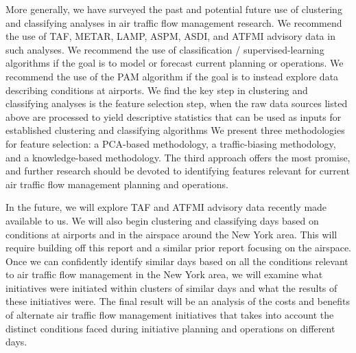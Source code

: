\documentclass[11pt]{scrartcl}
\begin{document}
More generally, we have surveyed the past and potential future use of clustering and classifying analyses in air traffic flow management research.  We recommend the use of TAF, METAR, LAMP, ASPM, ASDI, and ATFMI advisory data in such analyses.  We recommend the use of classification / supervised-learning algorithms if the goal is to model or forecast current planning or operations.  We recommend the use of the PAM algorithm if the goal is to instead explore data describing conditions at airports.  We find the key step in clustering and classifying analyses is the feature selection step, when the raw data sources listed above are processed to yield descriptive statistics that can be used as inputs for established clustering and classifying algorithms  We present three methodologies for feature selection: a PCA-based methodology, a traffic-biasing methodology, and a knowledge-based methodology.  The third approach offers the most promise, and further research should be devoted to identifying features relevant for current air traffic flow management planning and operations.

In the future, we will explore TAF and ATFMI advisory data recently made available to us.  We will also begin clustering and classifying days based on conditions at airports and in the airspace around the New York area.  This will require building off this report and a similar prior report focusing on the airspace.  Once we can confidently identify similar days based on all the conditions relevant to air traffic flow management in the New York area, we will examine what initiatives were initiated within clusters of similar days and what the results of these initiatives were.  The final result will be an analysis of the costs and benefits of alternate air traffic flow management initiatives that takes into account the distinct conditions faced during initiative planning and operations on different days. 


\end{document}
